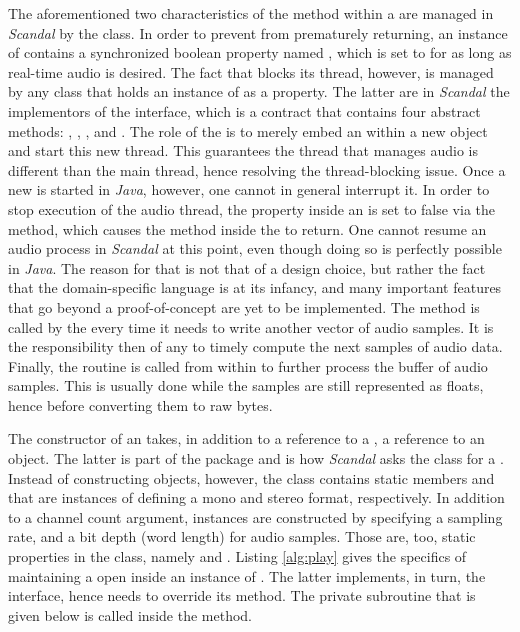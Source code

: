The aforementioned two characteristics of the  method within a  are managed in \emph{Scandal} by the  class. In order to prevent  from prematurely returning, an instance of  contains a synchronized boolean property named , which is set to  for as long as real-time audio is desired. The fact that  blocks its thread, however, is managed by any class that holds an instance of  as a property. The latter are in \emph{Scandal} the implementors of the  interface, which is a contract that contains four abstract methods: , , , and . The role of the  is to merely embed an  within a new  object and start this new thread. This guarantees the thread that manages audio is different than the main  thread, hence resolving the thread-blocking issue. Once a new  is started in \emph{Java}, however, one cannot in general interrupt it. In order to stop execution of the audio thread, the  property inside an  is set to false via the  method, which causes the  method inside the  to return. One cannot resume an audio process in \emph{Scandal} at this point, even though doing so is perfectly possible in \emph{Java}. The reason for that is not that of a design choice, but rather the fact that the domain-specific language is at its infancy, and many important features that go beyond a proof-of-concept are yet to be implemented. The  method is called by the  every time it needs to write another vector of audio samples. It is the responsibility then of any  to timely compute the next  samples of audio data. Finally, the  routine is called from within  to further process the buffer of audio samples. This is usually done while the samples are still represented as floats, hence before converting them to raw bytes.

The constructor of an  takes, in addition to a reference to a , a reference to an  object. The latter is part of the  package and is how \emph{Scandal} asks the  class for a . Instead of constructing  objects, however, the  class contains static members  and  that are instances of  defining a mono and stereo format, respectively. In addition to a channel count argument,  instances are constructed by specifying a sampling rate, and a bit depth (word length) for audio samples. Those are, too, static properties in the  class, namely  and . Listing \ref{alg:play} gives the specifics of maintaining a  open inside an instance of . The latter implements, in turn, the  interface, hence needs to override its  method. The private  subroutine that is given below is called inside the  method.

